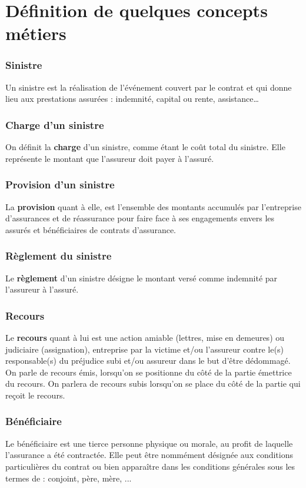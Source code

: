 \section{D\'efinition de quelques concepts m\'etiers}
\subsubsection{\textbf{Sinistre}}
Un sinistre est la réalisation de l'événement couvert par le contrat et qui donne lieu aux prestations assurées : indemnité, capital ou rente, assistance…
\subsubsection{\textbf{Charge d'un sinistre}}
 On d\'efinit la \textbf{charge} d'un sinistre, comme \'etant le co\^ut total du sinistre. Elle repr\'esente le montant que l'assureur doit payer \`a l'assur\'e. 
 
 \subsubsection{\textbf{Provision d'un sinistre}}
 La \textbf{provision} quant \`a elle, est l'ensemble des montants accumul\'es par l'entreprise d'assurances et de r\'eassurance pour faire face \`a ses engagements envers les assur\'es et b\'en\'eficiaires de contrats d'assurance. 
 
 \subsubsection{\textbf{R\`eglement du sinistre}}
 Le \textbf{r\`eglement} d'un sinistre d\'esigne le montant vers\'e comme indemnit\'e par l'assureur \`a l'assur\'e. 
 
 \subsubsection{\textbf{Recours}}
 Le \textbf{recours} quant à lui est une action amiable (lettres, mise en demeures) ou judiciaire (assignation), entreprise par la victime et/ou l'assureur contre le(s) responsable(s) du pr\'ejudice subi et/ou assureur dans le but d'\^etre d\'edommag\'e. On parle de recours \'emis, lorsqu'on se positionne du c\^ot\'e de la partie émettrice du recours. On parlera de recours subis lorsqu'on se place du c\^ot\'e de la partie qui reçoit le recours. 
 
 \subsubsection{\textbf{B\'en\'eficiaire}}
 Le b\'en\'eficiaire est une tierce personne physique ou morale, au profit de laquelle l'assurance a été contractée. Elle peut être nommément désignée aux conditions particulières du contrat ou bien apparaître dans les conditions générales sous les termes de : conjoint, p\`ere, m\`ere, ...
 
